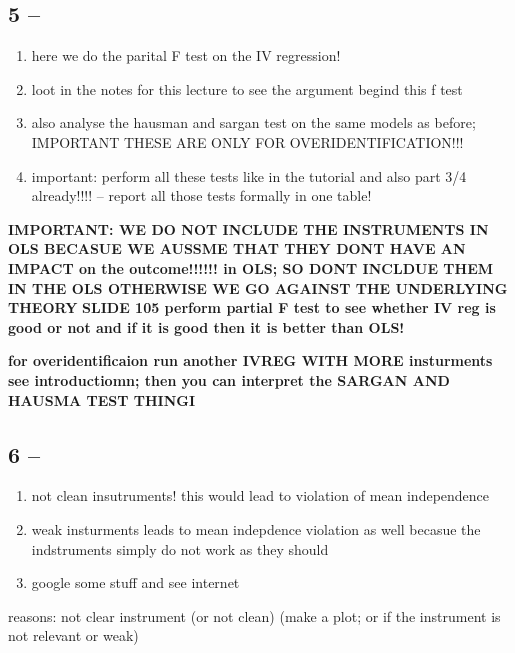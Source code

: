 \documentclass[a4paper]{article}
\begin{document}
\subsection{5 -- }
\begin{enumerate}
   \item here we do the parital F test on the IV regression!
   \item loot in the notes for this lecture to see the argument begind this f test 
   \item also analyse the hausman and sargan test on the same models as before; IMPORTANT THESE ARE ONLY FOR OVERIDENTIFICATION!!!
   \item important: perform all these tests like in the tutorial and also part 3/4 already!!!! -- report all those tests formally in one table!
\end{enumerate}



\textbf{IMPORTANT: WE DO NOT INCLUDE THE INSTRUMENTS IN OLS BECASUE WE AUSSME THAT THEY DONT HAVE AN IMPACT on the outcome!!!!!! in OLS; SO DONT INCLDUE THEM IN THE OLS OTHERWISE WE GO AGAINST THE UNDERLYING THEORY}
\textbf{SLIDE 105 perform partial F test to see whether IV reg is good or not and if it is good then it is better than OLS!}

\textbf{for overidentificaion run another IVREG WITH MORE insturments see introductiomn; then you can interpret the SARGAN AND HAUSMA TEST THINGI}

\subsection{6 -- }

\begin{enumerate}
   \item not clean insutruments! this would lead to violation of mean independence
   \item weak insturments leads to mean indepdence violation as well becasue the indstruments simply do not work as they should 
   \item google some stuff and see internet
\end{enumerate}



reasons: not clear instrument (or not clean) (make a plot; or if the instrument is not relevant or weak)

\end{document}
